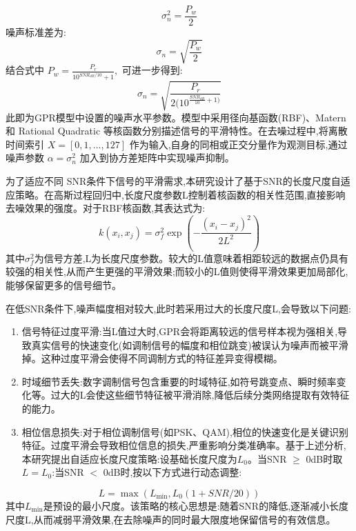 \documentclass{article}
\begin{document}
\begin{CJK}{UTF8}{gbsn}
\begin{equation}
    \sigma_{n}^{2}=\frac{P_{w}}{2}
    \label{eq:sigma_n_squared}
\end{equation}
噪声标准差为:
\begin{equation}
    \sigma_{n}=\sqrt{\frac{P_{w}}{2}}
    \label{eq:sigma_n}
\end{equation}
结合式中 $P_{w}=\frac{P_{r}}{10^{SNR_{dB}/10}+1},$ 可进一步得到:
\begin{equation}
    \sigma_{n}=\sqrt{\frac{P_{r}}{2(10^{\frac{SNR_{dB}}{10}+1)}}}
    \label{eq:sigma_n_final}
\end{equation}
此即为GPR模型中设置的噪声水平参数。模型中采用径向基函数(RBF)、Matern 和 Rational Quadratic 等核函数分别描述信号的平滑特性。在去噪过程中,将离散时间索引 $X=[0,1,...,127]$ 作为输入,自身的同相或正交分量作为观测目标,通过噪声参数 $\alpha=\sigma_{n}^{2}$ 加入到协方差矩阵中实现噪声抑制。

为了适应不同 SNR条件下信号的平滑需求,本研究设计了基于SNR的长度尺度自适应策略。在高斯过程回归中,长度尺度参数L控制着核函数的相关性范围,直接影响去噪效果的强度。对于RBF核函数,其表达式为:
\begin{equation}
    k(x_{i},x_{j})=\sigma_{f}^{2}\exp\left(-\frac{(x_{i}-x_{j})^{2}}{2L^{2}}\right)
    \label{eq:rbf_kernel}
\end{equation}
其中$\sigma_{f}^{2}$为信号方差,L为长度尺度参数。较大的L值意味着相距较远的数据点仍具有较强的相关性,从而产生更强的平滑效果;而较小的L值则使得平滑效果更加局部化,能够保留更多的信号细节。

在低SNR条件下,噪声幅度相对较大,此时若采用过大的长度尺度L,会导致以下问题:
\begin{enumerate}
    \item 信号特征过度平滑:当L值过大时,GPR会将距离较远的信号样本视为强相关,导致真实信号的快速变化(如调制信号的幅度和相位跳变)被误认为噪声而被平滑掉。这种过度平滑会使得不同调制方式的特征差异变得模糊。
    \item 时域细节丢失:数字调制信号包含重要的时域特征,如符号跳变点、瞬时频率变化等。过大的L会使这些细节特征被平滑消除,降低后续分类网络提取有效特征的能力。
    \item 相位信息损失:对于相位调制信号(如PSK、QAM),相位的快速变化是关键识别特征。过度平滑会导致相位信息的损失,严重影响分类准确率。基于上述分析,本研究提出自适应长度尺度策略:设基础长度尺度为$L_{0}$。当SNR $\ge$ 0dB时取$L = L_{0}$:当SNR $<$ 0dB时,按以下方式进行动态调整:
\end{enumerate}
\begin{equation}
    L=\max(L_{\min},L_{0}(1+SNR/20))
    \label{eq:adaptive_L}
\end{equation}
其中$L_{\min}$是预设的最小尺度。该策略的核心思想是:随着SNR的降低,逐渐减小长度尺度L,从而减弱平滑效果,在去除噪声的同时最大限度地保留信号的有效信息。


\end{CJK}
\end{document}
